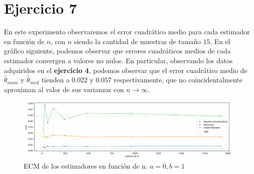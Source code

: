 \section{Ejercicio 7}
En este experimento observaremos el error cuadrático medio para cada estimador en función de $n$, con $n$ siendo la cantidad de muestras de tamaño $15$. En el gráfico siguiente, podemos observar que errores cuadráticos medios de cada estimador convergen a valores no nulos. En particular, observando los datos adquiridos en el \textbf{ejercicio 4}, podemos observar que el error cuadrático medio de $\hat{\theta}_{mom}$ y $\hat{\theta}_{med}$ tienden a $0.022$ y $0.057$ respectivamente, que no coincidentalmente aproximan al valor de sus varianzas con $n \rightarrow \infty$.

\begin{figure}[H]
	\centering
	\includegraphics[width=1\textwidth]{imagenes/ecm-en-f-de-n.png}
	\caption{\footnotesize ECM de los estimadores en función de n. $a=0, b=1$}
	\label{fig:ej7-ecm-en-f-de-n}
\end{figure}